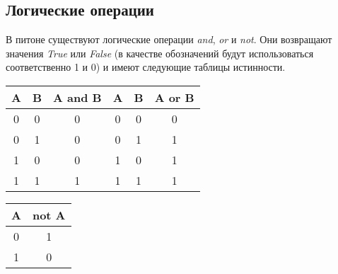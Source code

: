 \subsection*{Логические операции}

В питоне существуют логические операции \emph{and}, \emph{or} и \emph{not}. Они возвращают значения \emph{True} или \emph{False} (в качестве обозначений будут использоваться соответственно 1 и 0) и имеют следующие таблицы истинности.

\begin{tabular}{cc|c|cc|c}
	A&  B&  A and B&  A&  B&  A or B\\ 
	\hline
	0&  0&  0&  0&  0&  0\\ 
	0&  1&  0&  0&  1&  1\\ 
	1&  0&  0&  1&  0&  1\\ 
	1&  1&  1&  1&  1&  1\\ 
\end{tabular} 
%
\begin{tabular}{c|c}
	A&  not A\\ 
	\hline  
	0&  1\\ 
	1&  0\\  
\end{tabular} 